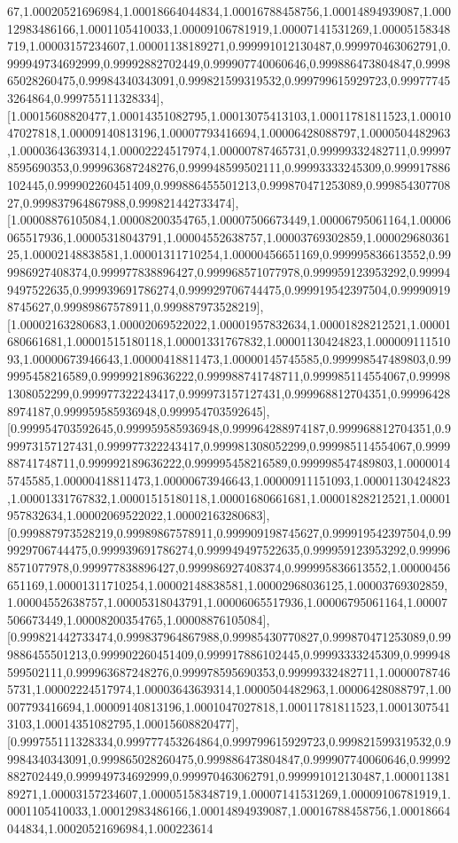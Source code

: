 \documentclass{article}
\begin{document}
67,1.00020521696984,1.00018664044834,1.00016788458756,1.00014894939087,1.00012983486166,1.0001105410033,1.00009106781919,1.00007141531269,1.00005158348719,1.00003157234607,1.00001138189271,0.999991012130487,0.999970463062791,0.999949734692999,0.99992882702449,0.999907740060646,0.999886473804847,0.999865028260475,0.99984340343091,0.999821599319532,0.999799615929723,0.999777453264864,0.999755111328334],[1.00015608820477,1.00014351082795,1.00013075413103,1.00011781811523,1.0001047027818,1.00009140813196,1.00007793416694,1.00006428088797,1.0000504482963,1.00003643639314,1.00002224517974,1.00000787465731,0.99999332482711,0.999978595690353,0.999963687248276,0.999948599502111,0.99993333245309,0.999917886102445,0.999902260451409,0.999886455501213,0.999870471253089,0.99985430770827,0.999837964867988,0.999821442733474],[1.00008876105084,1.00008200354765,1.00007506673449,1.00006795061164,1.00006065517936,1.00005318043791,1.00004552638757,1.00003769302859,1.00002968036125,1.00002148838581,1.00001311710254,1.00000456651169,0.999995836613552,0.999986927408374,0.999977838896427,0.999968571077978,0.999959123953292,0.999949497522635,0.999939691786274,0.999929706744475,0.999919542397504,0.999909198745627,0.99989867578911,0.999887973528219],[1.00002163280683,1.00002069522022,1.00001957832634,1.00001828212521,1.00001680661681,1.00001515180118,1.00001331767832,1.00001130424823,1.00000911151093,1.00000673946643,1.00000418811473,1.00000145745585,0.999998547489803,0.999995458216589,0.999992189636222,0.999988741748711,0.999985114554067,0.999981308052299,0.999977322243417,0.999973157127431,0.999968812704351,0.999964288974187,0.999959585936948,0.999954703592645],[0.999954703592645,0.999959585936948,0.999964288974187,0.999968812704351,0.999973157127431,0.999977322243417,0.999981308052299,0.999985114554067,0.999988741748711,0.999992189636222,0.999995458216589,0.999998547489803,1.00000145745585,1.00000418811473,1.00000673946643,1.00000911151093,1.00001130424823,1.00001331767832,1.00001515180118,1.00001680661681,1.00001828212521,1.00001957832634,1.00002069522022,1.00002163280683],[0.999887973528219,0.99989867578911,0.999909198745627,0.999919542397504,0.999929706744475,0.999939691786274,0.999949497522635,0.999959123953292,0.999968571077978,0.999977838896427,0.999986927408374,0.999995836613552,1.00000456651169,1.00001311710254,1.00002148838581,1.00002968036125,1.00003769302859,1.00004552638757,1.00005318043791,1.00006065517936,1.00006795061164,1.00007506673449,1.00008200354765,1.00008876105084],[0.999821442733474,0.999837964867988,0.99985430770827,0.999870471253089,0.999886455501213,0.999902260451409,0.999917886102445,0.99993333245309,0.999948599502111,0.999963687248276,0.999978595690353,0.99999332482711,1.00000787465731,1.00002224517974,1.00003643639314,1.0000504482963,1.00006428088797,1.00007793416694,1.00009140813196,1.0001047027818,1.00011781811523,1.00013075413103,1.00014351082795,1.00015608820477],[0.999755111328334,0.999777453264864,0.999799615929723,0.999821599319532,0.99984340343091,0.999865028260475,0.999886473804847,0.999907740060646,0.99992882702449,0.999949734692999,0.999970463062791,0.999991012130487,1.00001138189271,1.00003157234607,1.00005158348719,1.00007141531269,1.00009106781919,1.0001105410033,1.00012983486166,1.00014894939087,1.00016788458756,1.00018664044834,1.00020521696984,1.000223614
\end{document}
